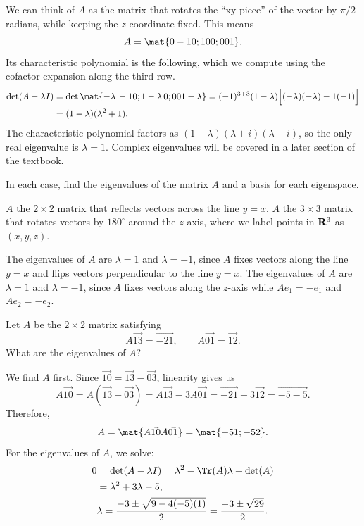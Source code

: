 \begin{problems}
\begin{solution}
  We can think of $A$ as the matrix that rotates the ``xy-piece'' of the vector
  by $\pi/2$ radians, while keeping the $z$-coordinate fixed.  This means
  \[A = \mat{0 -1 0; 1 0 0; 0 0 1}.\]
  Its characteristic polynomial is the following, which we compute using the cofactor
  expansion along the third row.
  \begin{align*}
    \det(A - \lambda I)
    & = \det\mat{-\lambda \, -1 0; 1 -\lambda \, 0; 0 0
      1-\lambda} = (-1)^{3+3}(1-\lambda)\Big[(-\lambda)(-\lambda)-1(-1)\Big]
    \\ & = (1-\lambda)(\lambda^2 + 1).
  \end{align*}
  The characteristic polynomial factors as $(1-\lambda)(\lambda+i)(\lambda-i)$,
  so the only real eigenvalue is $\lambda = 1$.  Complex eigenvalues will be
  covered in a later section of the textbook.
\end{solution}


\problem In each case, find the eigenvalues of the matrix $A$ and a basis
for each eigenspace.
\begin{subproblems}
  \subproblem $A$ the $2 \times 2$ matrix that reflects vectors across
  the line $y = x$.
  \subproblem $A$ the $3 \times 3$ matrix that rotates vectors by
  $180^\circ$ around the $z$-axis, where we label points in
  ${\bf R}^3$ as $(x, y, z)$.
\end{subproblems}

\begin{solution}
  \begin{subproblems}
    \subproblem The eigenvalues of $A$ are $\lambda = 1$ and
    $\lambda = -1$, since $A$ fixes vectors along the line $y=x$ and
    flips vectors perpendicular to the line $y=x$.
    \subproblem The eigenvalues of $A$ are $\lambda = 1$ and
    $\lambda = -1$, since $A$ fixes vectors along the $z$-axis while
    $Ae_1 = -e_1$ and $Ae_2 = -e_2$.
  \end{subproblems}
\end{solution}

\problem Let $A$ be the $2 \times 2$ matrix satisfying
\[A\vec{1 3} = \vec{-2 1}, \qquad A \vec{0 1} = \vec{1 2}.\]
What are the eigenvalues of $A$?

\begin{solution}
  We find $A$ first.  Since $\vec{1 0} = \vec{1 3} - \vec{0 3}$,
  linearity gives us
  \[A\vec{1 0} = A \left(\vec{1 3} - \vec{0 3}\right) = A \vec{1 3} -
    3 A \vec{0 1} = \vec{-2 1} - 3 \vec{1 2} = \vec{-5 -5}.\]
  Therefore,
  \[A = \mat{A\vec{1 0} A \vec{0 1}} = \mat{-5 1; -5 2}.\]
  For the eigenvalues of $A$, we solve:
  \begin{align*}
    0 & = \det(A-\lambda I) = \lambda^2- \Tr(A)\lambda + \det(A)
    \\ & = \lambda^2 + 3 \lambda -5, 
    \\ & \lambda = \dfrac{-3 \pm \sqrt{9-4(-5)(1)}}{2}
         = \dfrac{-3 \pm \sqrt{29}}{2}.
  \end{align*}
\end{solution}


\end{problems}
